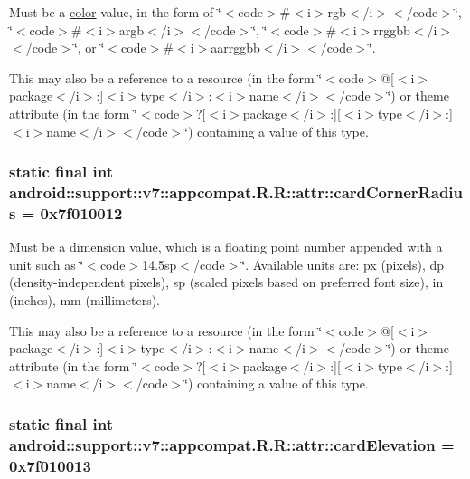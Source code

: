 Must be a \hyperlink{classandroid_1_1support_1_1v7_1_1appcompat_1_1_r_1_1color}{color} value, in the form of \char`\"{}$<$code$>$\#$<$i$>$rgb$<$/i$>$$<$/code$>$\char`\"{}, \char`\"{}$<$code$>$\#$<$i$>$argb$<$/i$>$$<$/code$>$\char`\"{}, \char`\"{}$<$code$>$\#$<$i$>$rrggbb$<$/i$>$$<$/code$>$\char`\"{}, or \char`\"{}$<$code$>$\#$<$i$>$aarrggbb$<$/i$>$$<$/code$>$\char`\"{}. 

This may also be a reference to a resource (in the form \char`\"{}$<$code$>$@\mbox{[}$<$i$>$package$<$/i$>$:\mbox{]}$<$i$>$type$<$/i$>$:$<$i$>$name$<$/i$>$$<$/code$>$\char`\"{}) or theme attribute (in the form \char`\"{}$<$code$>$?\mbox{[}$<$i$>$package$<$/i$>$:\mbox{]}\mbox{[}$<$i$>$type$<$/i$>$:\mbox{]}$<$i$>$name$<$/i$>$$<$/code$>$\char`\"{}) containing a value of this type. \hypertarget{classandroid_1_1support_1_1v7_1_1appcompat_1_1_r_1_1attr_26c5d675d9df291980c5facc92c60409}{
\subsubsection[{cardCornerRadius}]{\setlength{\rightskip}{0pt plus 5cm}static final int android::support::v7::appcompat.R.R::attr::cardCornerRadius = 0x7f010012}}
\label{classandroid_1_1support_1_1v7_1_1appcompat_1_1_r_1_1attr_26c5d675d9df291980c5facc92c60409}


Must be a dimension value, which is a floating point number appended with a unit such as \char`\"{}$<$code$>$14.5sp$<$/code$>$\char`\"{}. Available units are: px (pixels), dp (density-independent pixels), sp (scaled pixels based on preferred font size), in (inches), mm (millimeters). 

This may also be a reference to a resource (in the form \char`\"{}$<$code$>$@\mbox{[}$<$i$>$package$<$/i$>$:\mbox{]}$<$i$>$type$<$/i$>$:$<$i$>$name$<$/i$>$$<$/code$>$\char`\"{}) or theme attribute (in the form \char`\"{}$<$code$>$?\mbox{[}$<$i$>$package$<$/i$>$:\mbox{]}\mbox{[}$<$i$>$type$<$/i$>$:\mbox{]}$<$i$>$name$<$/i$>$$<$/code$>$\char`\"{}) containing a value of this type. \hypertarget{classandroid_1_1support_1_1v7_1_1appcompat_1_1_r_1_1attr_269f5afaaea21f1e91141d6c3b37bfb3}{
\subsubsection[{cardElevation}]{\setlength{\rightskip}{0pt plus 5cm}static final int android::support::v7::appcompat.R.R::attr::cardElevation = 0x7f010013}}
\label{classandroid_1_1support_1_1v7_1_1appcompat_1_1_r_1_1attr_269f5afaaea21f1e91141d6c3b37bfb3}


